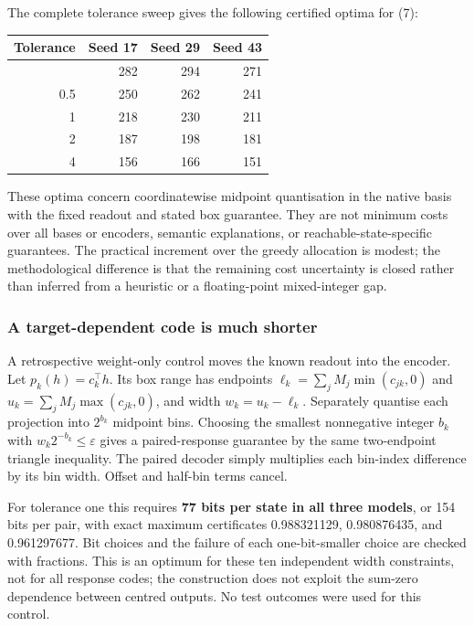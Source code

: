 \documentclass[
  british,
  11pt,
  a4paper,
]{article}
\newcounter{none} %
\begin{document}
The complete tolerance sweep gives the following certified optima for
(7):

{\def\LTcaptype{none} %
\begin{longtable}[]{@{}rrrr@{}}
\toprule\noalign{}
Tolerance & Seed 17 & Seed 29 & Seed 43 \\
\midrule\noalign{}
\endhead
\bottomrule\noalign{}
\endlastfoot
0.25 & 282 & 294 & 271 \\
0.5 & 250 & 262 & 241 \\
1 & 218 & 230 & 211 \\
2 & 187 & 198 & 181 \\
4 & 156 & 166 & 151 \\
\end{longtable}
}

These optima concern coordinatewise midpoint quantisation in the native
basis with the fixed readout and stated box guarantee. They are not
minimum costs over all bases or encoders, semantic explanations, or
reachable-state-specific guarantees. The practical increment over the
greedy allocation is modest; the methodological difference is that the
remaining cost uncertainty is closed rather than inferred from a
heuristic or a floating-point mixed-integer gap.

\subsubsection{A target-dependent code is much
shorter}\label{a-target-dependent-code-is-much-shorter}

A retrospective weight-only control moves the known readout into the
encoder. Let \(p_k(h)=c_k^\top h\). Its box range has endpoints
\(\ell_k=\sum_jM_j\min(c_{jk},0)\) and \(u_k=\sum_jM_j\max(c_{jk},0)\),
and width \(w_k=u_k-\ell_k\). Separately quantise each projection into
\(2^{b_k}\) midpoint bins. Choosing the smallest nonnegative integer
\(b_k\) with \(w_k2^{-b_k}\le\varepsilon\) gives a paired-response
guarantee by the same two-endpoint triangle inequality. The paired
decoder simply multiplies each bin-index difference by its bin width.
Offset and half-bin terms cancel.

For tolerance one this requires \textbf{77 bits per state in all three
models}, or 154 bits per pair, with exact maximum certificates
0.988321129, 0.980876435, and 0.961297677. Bit choices and the failure
of each one-bit-smaller choice are checked with fractions. This is an
optimum for these ten independent width constraints, not for all
response codes; the construction does not exploit the sum-zero
dependence between centred outputs. No test outcomes were used for this
control.
\end{document}
